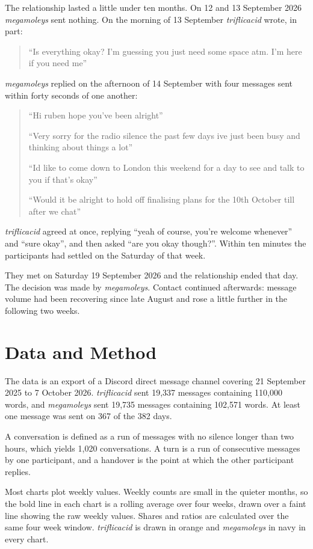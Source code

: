 \documentclass[11pt,a4paper]{article}
\newcommand{\userA}{\textit{triflicacid}}
\newcommand{\userB}{\textit{megamoleys}}
\begin{document}
The relationship lasted a little under ten months. On 12 and 13 September 2026
\userB{} sent nothing. On the morning of 13 September \userA{} wrote, in part:

\begin{quote}
``Is everything okay? I'm guessing you just need some space atm. I'm here if you need
me''
\end{quote}

\userB{} replied on the afternoon of 14 September with four messages sent within
forty seconds of one another:

\begin{quote}
``Hi ruben hope you've been alright''

``Very sorry for the radio silence the past few days ive just been busy and thinking
about things a lot''

``Id like to come down to London this weekend for a day to see and talk to you if
that's okay''

``Would it be alright to hold off finalising plans for the 10th October till after we
chat''
\end{quote}

\userA{} agreed at once, replying ``yeah of course, you're welcome whenever'' and
``sure okay'', and then asked ``are you okay though?''. Within ten minutes the
participants had settled on the Saturday of that week.

They met on Saturday 19 September 2026 and the relationship ended that day. The
decision was made by \userB{}. Contact continued afterwards: message volume had been
recovering since late August and rose a little further in the following two weeks.

\section{Data and Method}

The data is an export of a Discord direct message channel covering 21 September 2025
to 7 October 2026. \userA{} sent 19,337 messages containing 110,000 words, and \userB{}
sent 19,735 messages containing 102,571 words. At least one message was sent on 367 of
the 382 days.

A conversation is defined as a run of messages with no silence longer than
two hours, which yields 1,020 conversations. A turn is a run of consecutive messages
by one participant, and a handover is the point at which the other participant
replies.

Most charts plot weekly values. Weekly counts are small in the quieter months, so the
bold line in each chart is a rolling average over four weeks, drawn over a faint line
showing the raw weekly values. Shares and ratios are calculated over the same four
week window. \userA{} is drawn in orange and \userB{} in navy in every chart.
\end{document}
